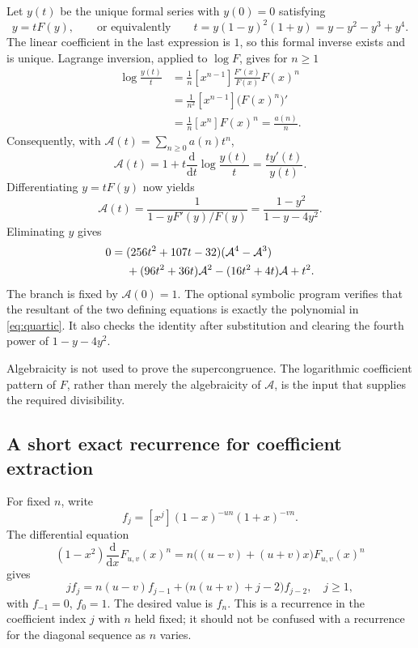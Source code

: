 \documentclass[11pt,a4paper]{article}
\numberwithin{equation}{section}
\theoremstyle{definition}
\theoremstyle{remark}
\newcommand{\Fp}{F_{u,v}}
\begin{document}
Let $y(t)$ be the unique formal series with $y(0)=0$ satisfying
\begin{equation}\label{eq:y}
 y=tF(y),\qquad\text{or equivalently}\qquad
 t=y(1-y)^2(1+y)=y-y^2-y^3+y^4.
\end{equation}
The linear coefficient in the last expression is $1$, so this formal
inverse exists and is unique. Lagrange inversion, applied to $\log F$,
gives for $n\geq1$
\begin{align*}
 [t^n]\log\frac{y(t)}t
 &=\frac1n[x^{n-1}]\frac{F'(x)}{F(x)}F(x)^n\\
 &=\frac1{n^2}[x^{n-1}]\bigl(F(x)^n\bigr)'\\
 &=\frac1n[x^n]F(x)^n=\frac{a(n)}n.
\end{align*}
Consequently, with $\mathcal A(t)=\sum_{n\geq0}a(n)t^n$,
\[
 \mathcal A(t)=1+t\frac{\mathrm d}{\mathrm dt}\log\frac{y(t)}t
             =\frac{t y'(t)}{y(t)}.
\]
Differentiating $y=tF(y)$ now yields
\begin{equation}\label{eq:parametric}
 \mathcal A(t)=\frac1{1-yF'(y)/F(y)}
             =\frac{1-y^2}{1-y-4y^2}.
\end{equation}
Eliminating $y$ gives
\begin{align}\label{eq:quartic}
 0={}&(256t^2+107t-32)(\mathcal A^4-\mathcal A^3)\notag\\
    &+(96t^2+36t)\mathcal A^2-(16t^2+4t)\mathcal A+t^2.
\end{align}
The branch is fixed by $\mathcal A(0)=1$. The optional symbolic program
verifies that the resultant of the two defining equations is exactly
the polynomial in \eqref{eq:quartic}. It also checks the identity after
substitution and clearing the fourth power of $1-y-4y^2$.

Algebraicity is not used to prove the supercongruence. The logarithmic
coefficient pattern of $F$, rather than merely the algebraicity of
$\mathcal A$, is the input that supplies the required divisibility.

\subsection{A short exact recurrence for coefficient extraction}

For fixed $n$, write
\[
 f_j=[x^j](1-x)^{-un}(1+x)^{-vn}.
\]
The differential equation
\[
 (1-x^2)\frac{\mathrm d}{\mathrm dx}\Fp(x)^n
   =n\bigl((u-v)+(u+v)x\bigr)\Fp(x)^n
\]
gives
\begin{equation}\label{eq:coefficient-recurrence}
 j f_j=n(u-v)f_{j-1}+\bigl(n(u+v)+j-2\bigr)f_{j-2},
 \quad j\geq1,
\end{equation}
with $f_{-1}=0$, $f_0=1$. The desired value is $f_n$.
This is a recurrence in the coefficient index $j$ with $n$ held fixed;
it should not be confused with a recurrence for the diagonal sequence
as $n$ varies.
\end{document}
